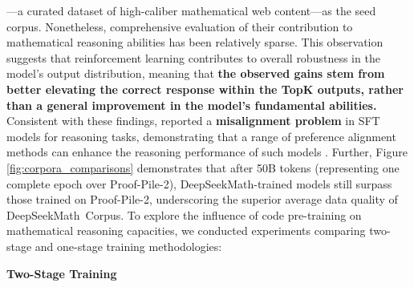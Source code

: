 \begin{itemize}[topsep=0pt]
\begin{itemize}[topsep=0pt]
\begin{itemize}[topsep=0pt]
\begin{itemize}[topsep=0pt]
\citep{openwebmath}—a curated dataset of high-caliber mathematical web content—as the seed corpus. Nonetheless, comprehensive evaluation of their contribution to mathematical reasoning abilities has been relatively sparse. This observation suggests that reinforcement learning contributes to overall robustness in the model's output distribution, meaning that \textbf{the observed gains stem from better elevating the correct response within the TopK outputs, rather than a general improvement in the model’s fundamental abilities.} Consistent with these findings, \citep{wang2023making} reported a \textbf{misalignment problem} in SFT models for reasoning tasks, demonstrating that a range of preference alignment methods can enhance the reasoning performance of such models \citep{yuan2023rrhf,song2023preference,wang2023making}. Further, Figure \ref{fig:corpora_comparisons} demonstrates that after 50B tokens (representing one complete epoch over Proof-Pile-2), DeepSeekMath-trained models still surpass those trained on Proof-Pile-2, underscoring the superior average data quality of DeepSeekMath~Corpus. To explore the influence of code pre-training on mathematical reasoning capacities, we conducted experiments comparing two-stage and one-stage training methodologies:

\textbf{Two-Stage Training}


\end{itemize}
\end{itemize}
\end{itemize}
\end{itemize}
